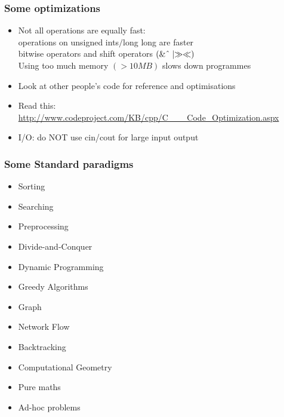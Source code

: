 \documentclass{beamer}
\begin{document}
\begin{frame}
	\frametitle{Some optimizations}
\begin{itemize}
\item Not all operations are equally fast: \\ 
operations on unsigned ints$/$long long are faster \\
bitwise operators and shift operators $(\& \XOR \mid \gg \ll)$ \\
Using too much memory $( > 10 MB)$ slows down programmes
\pause
\item Look at other people's code for reference and optimisations
\pause
\item Read this: \url{http://www.codeproject.com/KB/cpp/C___Code_Optimization.aspx}
\pause
\item I/O: do NOT use cin/cout for large input output
\end{itemize}
\end{frame}

\begin{frame}
	\frametitle{Some Standard paradigms}
\begin{itemize}
\item Sorting
\item Searching
\item Preprocessing
\item Divide-and-Conquer
\item Dynamic Programming
\item Greedy Algorithms
\item Graph
\item Network Flow
\item Backtracking
\item Computational Geometry
\item Pure maths
\item Ad-hoc problems
\end{itemize}
\end{frame}
\end{document}
